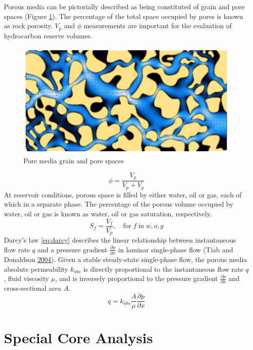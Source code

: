 \documentclass[english,msc,numbers]{coppe}
\begin{document}
  Porous media can be pictorially described as being constituted of grain and pore spaces (Figure \ref{fig:porous-media}). The percentage of the total space occupied by pores is known as rock porosity. \(V_p\) and \(\phi\) measurements are important for the evaluation of hydrocarbon reserve volumes.
  \begin{figure}
  
  {\centering \includegraphics[width=1\linewidth]{figure/2-1-Porous-media} 
  
  }
  
  \caption{Pore media grain and pore spaces}\label{fig:porous-media}
  \end{figure}
  \begin{equation} 
    \phi = \frac{V_p}{V_p + V_g}
    \label{eq:phi}
  \end{equation}
  At reservoir conditions, porous space is filled by either water, oil or gas, each of which in a separate phase. The percentage of the porous volume occupied by water, oil or gas is known as water, oil or gas saturation, respectively.
  \begin{equation} 
    S_f = \frac{V_f}{V_p},\quad \text{for} \;f \; \text{in} \; {w, o, g}
    \label{eq:saturation}
  \end{equation}
  Darcy's law \eqref{eq:darcy} describes the linear relationship between instantaneous flow rate \(q\) and a pressure gradient \(\frac{\partial p}{\partial x}\) in laminar single-phase flow (Tiab and Donaldson \protect\hyperlink{ref-Tiab2004}{2004}). Given a stable steady-state single-phase flow, the porous media absolute permeability \(k_{abs}\) is directly proportional to the instantaneous flow rate \(q\), fluid viscosity \(\mu\), and is inversely proportional to the pressure gradient \(\frac{\partial p}{\partial x}\) and cross-sectional area \(A\).
  \begin{equation} 
    q = k_{abs}\frac{A}{\mu}\frac{\partial p}{\partial x}
    \label{eq:darcy}
  \end{equation}
  \hypertarget{special-core-analysis}{%
  \section{Special Core Analysis}\label{special-core-analysis}}
  
\end{document}
